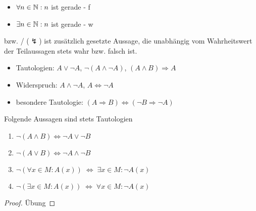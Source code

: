 \begin{example}
	\begin{itemize}
		\item $\forall n\in\mathbb{N}:n$ ist gerade - f
		\item $\exists n\in\mathbb{N}:n$ ist gerade - w
	\end{itemize}
\end{example}

\begin{definition}
	 bzw. \slash{} ($\lightning$) ist zusätzlich gesetzte Aussage, die unabhängig vom Wahrheitswert der Teilaussagen stets wahr bzw. falsch ist.
\end{definition}

\begin{example}
	\begin{itemize}
		\item Tautologien: $A\lor\neg A$, $\neg(A\land\neg A)$, $(A\land B)\Rightarrow A$
		\item Widerspruch: $A\land\neg A$, $A\iff\neg A$
		\item besondere Tautologie: $(A\Rightarrow B)\iff (\neg B\Rightarrow \neg A)$
	\end{itemize}
\end{example}

\begin{proposition}
	Folgende Aussagen sind stets Tautologien
	\begin{enumerate}[label={\alph*)}]
		\item $\neg(A\land B) \Leftrightarrow \neg A \lor \neg B$
		\item $\neg(A\lor B) \Leftrightarrow \neg A\land \neg B$
		\item $\neg (\forall x\in M: A(x)) \;\Leftrightarrow \; \exists x\in M:\neg A(x)$
		\item $\neg (\exists x\in M: A(x)) \;\Leftrightarrow \;\forall x\in M:\neg A(x)$
	\end{enumerate}
\end{proposition}

\begin{proof}
	Übung
\end{proof}

